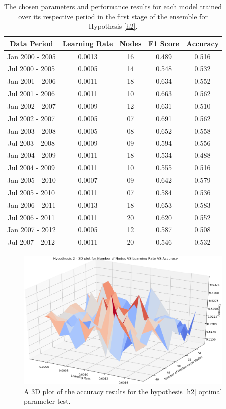 \documentclass{UoYCSproject}
\begin{document}
\begin{table}[h]
    \centering
    \begin{tabular}{|c|c|c|c|c|} \hline
        \textbf{Data Period} & \textbf{Learning Rate} & \textbf{Nodes} & \textbf{F1 Score} & \textbf{Accuracy} \\ \hline
        Jan 2000 - 2005 & 0.0013 & 16 & 0.489 & 0.516 \\
        Jul 2000 - 2005 & 0.0005 & 14 & 0.548 & 0.532 \\
        Jan 2001 - 2006 & 0.0011 & 18 & 0.634 & 0.552 \\
        Jul 2001 - 2006 & 0.0011 & 10 & 0.663 & 0.562 \\
        Jan 2002 - 2007 & 0.0009 & 12 & 0.631 & 0.510 \\
        Jul 2002 - 2007 & 0.0005 & 07 & 0.691 & 0.562 \\
        Jan 2003 - 2008 & 0.0005 & 08 & 0.652 & 0.558 \\
        Jul 2003 - 2008 & 0.0009 & 09 & 0.594 & 0.556 \\
        Jan 2004 - 2009 & 0.0011 & 18 & 0.534 & 0.488 \\
        Jul 2004 - 2009 & 0.0011 & 10 & 0.555 & 0.516 \\
        Jan 2005 - 2010 & 0.0007 & 09 & 0.642 & 0.579 \\
        Jul 2005 - 2010 & 0.0011 & 07 & 0.584 & 0.536 \\
        Jan 2006 - 2011 & 0.0013 & 18 & 0.653 & 0.583 \\
        Jul 2006 - 2011 & 0.0011 & 20 & 0.620 & 0.552 \\
        Jan 2007 - 2012 & 0.0005 & 12 & 0.587 & 0.508 \\
        Jul 2007 - 2012 & 0.0011 & 20 & 0.546 & 0.532 \\
        \hline
    \end{tabular}
    \caption{The chosen parameters and performance results for each model trained over its respective period in the first stage of the ensemble for Hypothesis \ref{h2}.}
    \label{tab:h2_stage1}
\end{table}

\begin{figure}[h]
\includegraphics[width=10.5cm]{h2_accuracy.png}
\centering
\caption{A 3D plot of the accuracy results for the hypothesis \ref{h2} optimal parameter test.} 
\label{fig:h2_plot_accuracy}
\end{figure}
\end{document}
